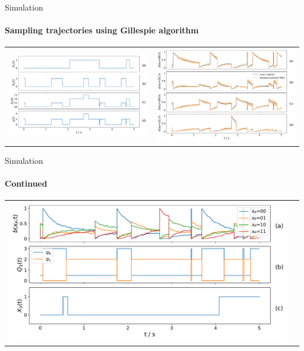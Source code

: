 \documentclass[
english,%
aspectratio=169,%
color={accentcolor=3b},
logo=true,%
colorframetitle=false,%
]{tudabeamer}
\begin{document}
\begin{frame}{Simulation}
\framesubtitle{Sampling trajectories using Gillespie algorithm}
\vspace{12pt}
\begin{tabular}{cc}
\includegraphics[height=0.6\textheight]{figures/parent_traj}
&
\includegraphics[height=0.6\textheight]{figures/belief_traj}
\end{tabular}
\end{frame}


\begin{frame}{Simulation}
\framesubtitle{Continued}
\centering
\begin{tabular}{cc}
\includegraphics[height=0.7\textheight]{figures/q_traj}
\end{tabular}
\end{frame}
\end{document}

